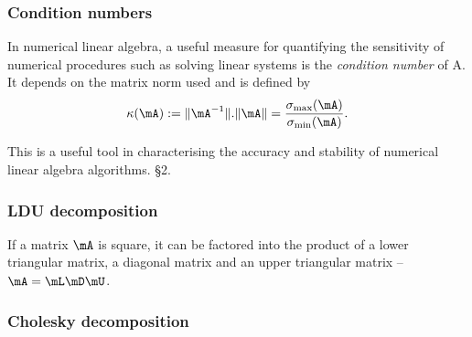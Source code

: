 \subsubsection{Condition numbers}
In numerical linear algebra, a useful measure for quantifying the sensitivity of numerical procedures such as
solving linear systems is the \emph{condition number} of A. It depends on the matrix norm used and is defined by
\[
	\kappa(\mA) := \|\mA^{-1}\|.\|\mA\| = \frac{\sigma_{\text{max}}(\mA)}{\sigma_{\text{min}}(\mA)}.
\]

This is a useful tool in characterising the accuracy and stability of numerical linear algebra algorithms.
\cite{Golub:1996:MC:248979} \S 2.

\subsubsection{LDU decomposition}

If a matrix $\mA$ is square, it can be factored into the product of a lower triangular matrix, a diagonal matrix and
an upper triangular matrix -- $\mA = \mL \mD \mU$.

\subsubsection{Cholesky decomposition}

